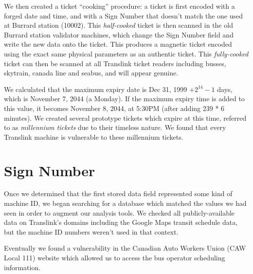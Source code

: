\documentclass[fontsize=12pt]{scrartcl}
\begin{document}
We then created a ticket ``cooking'' procedure: a ticket is first encoded with a forged date and time, and with a Sign Number that doesn't match the one used at Burrard station (10002). This \emph{half-cooked} ticket is then scanned in the old Burrard station validator machines, which change the Sign Number field and write the new data onto the ticket. This produces a magnetic ticket encoded using the exact same physical parameters as an authentic ticket. This \emph{fully-cooked} ticket can then be scanned at all Translink ticket readers including busses, skytrain, canada line and seabus, and will appear genuine.

We calculated that the maximum expiry date is Dec 31, 1999 $+ 2^{14}-1$ days, which is November 7, 2044 (a Monday). If the maximum expiry time is added to this value, it becomes November 8, 2044, at 5:30PM (after adding 239 * 6 minutes). We created several prototype tickets which expire at this time, referred to as \emph{millennium tickets} due to their timeless nature. We found that every Translink machine is vulnerable to these millennium tickets.

\section{Sign Number}
Once we determined that the first stored data field represented some kind of machine ID, we began searching for a database which matched the values we had seen in order to augment our analysis tools. We checked all publicly-available data on Translink's domains including the Google Maps transit schedule data, but the machine ID numbers weren't used in that context.

Eventually we found a vulnerability in the Canadian Auto Workers Union (CAW Local 111) website \cite{caw111} which allowed us to access the bus operator scheduling information. 

\newpage
\end{document}
